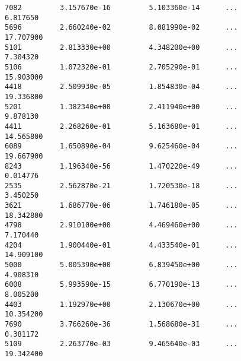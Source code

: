 \documentclass[11pt]{article}
\begin{document}
\begin{verbatim}
7082         3.157670e-16         5.103360e-14      ...             6.817650   
5696         2.660240e-02         8.081990e-02      ...            17.707900   
5101         2.813330e+00         4.348200e+00      ...             7.304320   
5106         1.072320e-01         2.705290e-01      ...            15.903000   
4418         2.509930e-05         1.854830e-04      ...            19.336800   
5201         1.382340e+00         2.411940e+00      ...             9.878130   
4411         2.268260e-01         5.163680e-01      ...            14.565800   
6089         1.650890e-04         9.625460e-04      ...            19.667900   
8243         1.196340e-56         1.470220e-49      ...             0.014776   
2535         2.562870e-21         1.720530e-18      ...             3.450250   
3621         1.686770e-06         1.746180e-05      ...            18.342800   
4798         2.910100e+00         4.469460e+00      ...             7.170440   
4204         1.900440e-01         4.433540e-01      ...            14.909100   
5000         5.005390e+00         6.839450e+00      ...             4.908310   
6008         5.993590e-15         6.770190e-13      ...             8.005200   
4403         1.192970e+00         2.130670e+00      ...            10.354200   
7690         3.766260e-36         1.568680e-31      ...             0.381172   
5109         2.263770e-03         9.465640e-03      ...            19.342400   


\end{verbatim}
\end{document}
